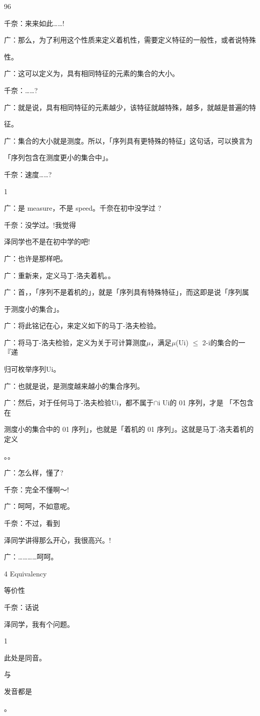 96\par
千奈：来来如此……!\par
广：那么，为了利用这个性质来定义着机性，需要定义特征的一般性，或者说特殊\par
性。\par
广：这可以定义为，具有相同特征的元素的集合的大小。\par
千奈：……?\par
广：就是说，具有相同特征的元素越少，该特征就越特殊，越多，就越是普遍的特\par
征。\par
广：集合的大小就是测度。所以，「序列具有更特殊的特征」这句话，可以换言为\par
「序列包含在测度更小的集合中」。\par
千奈：速度……?\par
1\par
广：是 measure，不是 speed。千奈在初中没学过 ?\par
千奈：没学过。!我觉得\par
泽同学也不是在初中学的吧!\par
广：也许是那样吧。\par
广：重新来，定义马丁-洛夫着机。。\par
广：首，，「序列不是着机的」，就是「序列具有特殊特征」，而这即是说「序列属\par
于测度小的集合」。\par
广：将此铭记在心，来定义如下的马丁-洛夫检验。\par
广：将马丁-洛夫检验，定义为关于可计算测度$\mu$，满足$\mu$(Ui) $\leq$ 2-i的集合的一『递\par
归可枚举序列Ui。\par
广：也就是说，是测度越来越小的集合序列。\par
广：然后，对于任何马丁-洛夫检验Ui，都不属于$\cap$i Ui的 01 序列，才是 「不包含在\par
测度小的集合中的 01 序列」，也就是「着机的 01 序列」。这就是马丁-洛夫着机的定义\par
。。\par
广：怎么样，懂了?\par
千奈：完全不懂啊～!\par
广：呵呵，不如意呢。\par
千奈：不过，看到\par
泽同学讲得那么开心，我很高兴。!\par
广：…………呵呵。\par
4 Equivalency\par
等价性\par
千奈：话说\par
泽同学，我有个问题。\par
1\par
此处是同音。\par
与\par
发音都是\par
。\par

